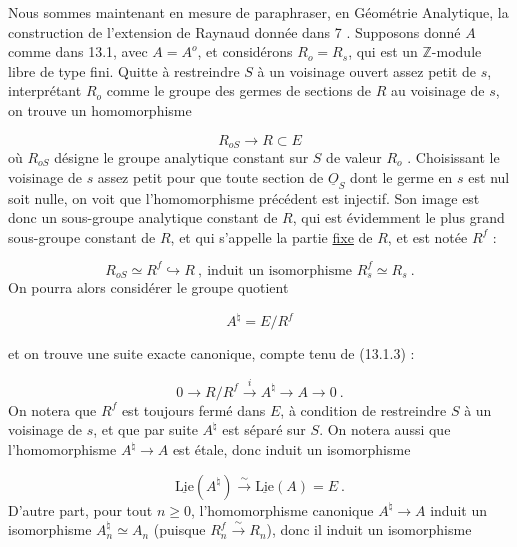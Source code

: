 Nous sommes maintenant en mesure de paraphraser, en Géométrie Analytique, la construction de l'extension de Raynaud donnée dans 7 . Supposons donné $A$ comme dans 13.1, avec $A = A^o$, et considérons $R_o = R_s$, qui est un $\mathbb{Z}$-module libre de type fini. Quitte à restreindre $S$ à un voisinage ouvert assez petit de $s$, interprétant $R_o$ comme le groupe des germes de sections de $R$ au voisinage de $s$, on trouve un homomorphisme

\begin{equation}\tag{13.3.1}
R_{oS} \longrightarrow R \subset E
\end{equation}
où $R_{oS}$ désigne le groupe analytique constant sur $S$ de valeur $R_o$ . Choisissant le voisinage de $s$ assez petit pour que toute section de $\underline{O}_S$ dont le germe en $s$ est nul soit nulle, on voit que l'homomorphisme précédent est injectif. Son image est donc un sous-groupe analytique constant de $R$, qui est évidemment le plus grand sous-groupe constant de $R$, et qui s'appelle la partie \underline{fixe} de $R$, et est notée $R^f$ :

\begin{equation}\tag{13.3.2}
R_{oS} \simeq R^f \hookrightarrow R \ , \ \mbox{induit un isomorphisme } R^f_s \simeq R_s \ .
\end{equation}
On pourra alors considérer le groupe quotient

\begin{equation}\tag{13.3.3}
A^\natural = E/R^f
\end{equation}


et on trouve une suite exacte canonique, compte tenu de (13.1.3) :

\begin{equation}\tag{13.3.4}
0 \longrightarrow R/R^f \stackrel{i}{\longrightarrow} A^\natural \longrightarrow A \longrightarrow 0 \ .
\end{equation}
On notera que $R^f$ est toujours fermé dans $E$, à condition de restreindre $S$ à un voisinage de $s$, et que par suite $A^\natural$ est séparé sur $S$. On notera aussi que l'homomorphisme $A^\natural \longrightarrow A$ est étale, donc induit un isomorphisme

\begin{equation}\tag{13.3.5}
\underline{\mathrm{Lie}}(A^\natural) \stackrel{\sim}{\longrightarrow} \underline{\mathrm{Lie}}(A) = E \ .
\end{equation}
D'autre part, pour tout $n \geqslant 0$, l'homomorphisme canonique $A^\natural \longrightarrow A$ induit un isomorphisme $A^\natural_n \simeq A_n$ (puisque $R^f_n \stackrel{\sim}{\longrightarrow} R_n$), donc il induit un isomorphisme

